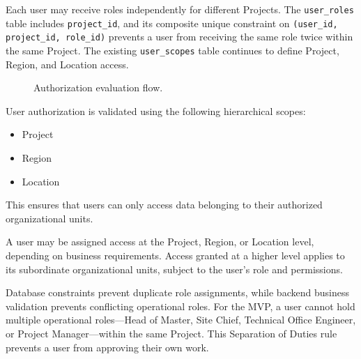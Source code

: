 \documentclass[11pt]{article}
\begin{document}
Each user may receive roles independently for different Projects. The
\texttt{user\_roles} table includes \texttt{project\_id}, and its composite
unique constraint on \texttt{(user\_id, project\_id, role\_id)} prevents a user
from receiving the same role twice within the same Project. The existing
\texttt{user\_scopes} table continues to define Project, Region, and Location
access.

\begin{figure}[htbp]
    \centering
    \caption{Authorization evaluation flow.}
    \label{fig:authorization-evaluation-flow}
\end{figure}

User authorization is validated using the following hierarchical scopes:

\begin{itemize}
    \item Project
    \item Region
    \item Location
\end{itemize}

This ensures that users can only access data belonging to their authorized
organizational units.

A user may be assigned access at the Project, Region, or Location level,
depending on business requirements. Access granted at a higher level applies
to its subordinate organizational units, subject to the user's role and
permissions.

Database constraints prevent duplicate role assignments, while backend
business validation prevents conflicting operational roles. For the MVP, a
user cannot hold multiple operational roles---Head of Master, Site Chief,
Technical Office Engineer, or Project Manager---within the same Project. This
Separation of Duties rule prevents a user from approving their own work.
\end{document}

